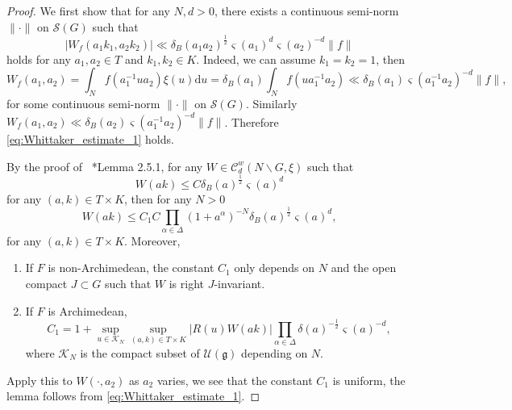 \documentclass[letterpaper,11pt]{amsart}
\newcommand{\fg}{\mathfrak{g}}
\newcommand{\cC}{\mathcal{C}}
\newcommand{\cK}{\mathcal{K}}
\newcommand{\cS}{\mathcal{S}}
\newcommand{\cU}{\mathcal{U}}
\newcommand{\rd}{\mathrm{d}}
\newcommand{\<}{\negthickspace}
\theoremstyle{definition}
\theoremstyle{plain}
\theoremstyle{remark}
\numberwithin{equation}{section}
\begin{document}
\begin{proof}
    We first show that for any $N,d>0$, there exists a continuous semi-norm $\| \cdot \|$ on $\cS(G)$ such that
    \begin{equation} \label{eq:Whittaker_estimate_1}
        \lvert W_f(a_1k_1,a_2k_2) \rvert \ll \delta_B(a_1a_2)^{\frac{1}{2}} \varsigma(a_1)^d \varsigma(a_2)^{-d}  \lVert f \rVert
    \end{equation}
    holds for any $a_1,a_2 \in T$ and $k_1,k_2 \in K$. Indeed, we can assume $k_1=k_2=1$, then
    \begin{equation*}
        W_f(a_1,a_2) = \int_N f(a_1^{-1}ua_2) \xi(u) \rd u = \delta_B(a_1) \int_N f(ua_1^{-1}a_2) \ll \delta_B(a_1) \varsigma(a_1^{-1}a_2)^{-d} \| f\|,
    \end{equation*}
    for some continuous semi-norm $\|\cdot\|$ on $\cS(G)$. Similarly $W_f(a_1,a_2) \ll \delta_B(a_2)\varsigma(a_1^{-1}a_2)^{-d} \|f\|$. Therefore \eqref{eq:Whittaker_estimate_1} holds.

    By the proof of ~\cite{BP4}*{Lemma 2.5.1}, for any $W \in \cC^w_d(N \backslash G,\xi)$ such that 
        \begin{equation*}
            W(ak) \le C \delta_B(a)^{\frac 12} \varsigma(a)^d
        \end{equation*}
        for any $(a,k) \in T \times K$, then for any $N>0$
        \begin{equation*}
            W(ak) \le C_1 C \prod_{\alpha \in \Delta} (1+a^{\alpha})^{-N} \delta_B(a)^{\frac 12} \varsigma(a)^d,
        \end{equation*} 
        for any $(a,k) \in T \times K$. Moreover,
    \begin{enumerate}
        \item If $F$ is non-Archimedean, the constant $C_1$ only depends on $N$ and the open compact $J \subset G$ such that $W$ is right $J$-invariant.
        \item If $F$ is Archimedean, 
        \begin{equation*}
            C_1 = 1 + \sup_{u \in \cK_N} \sup_{(a,k) \in T \times K} \lvert R(u)W(ak) \rvert \prod_{\alpha \in \Delta} \delta(a)^{-\frac 12} \varsigma(a)^{-d},
        \end{equation*}
        where $\cK_N$ is the compact subset of $\cU(\fg)$ depending on $N$.
    \end{enumerate}
    Apply this to $W(\cdot,a_2)$ as $a_2$ varies, we see that the constant $C_1$ is uniform, the lemma follows from \eqref{eq:Whittaker_estimate_1}.
\end{proof}
\end{document}
